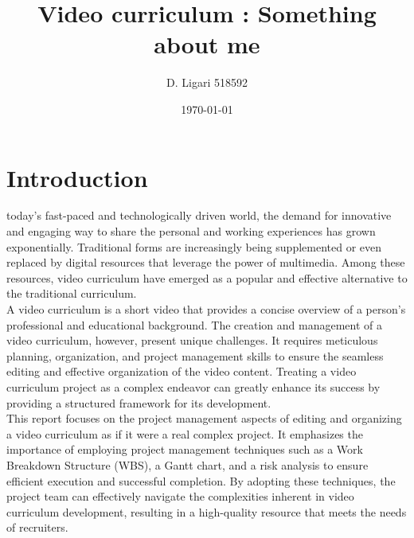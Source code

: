 \documentclass[eng]{class}
\title{Video curriculum : Something about me}
\author{D. Ligari 518592}
\affil{Digital content retrieval, University of Pavia, Department of Computer Engineering (Data Science), Pavia, Italy}
\date{\today}
\begin{document}
\maketitle
\tableofcontents
\thispagestyle{FirstPage}
\section{Introduction}
today's fast-paced and technologically driven world, the demand for innovative and engaging way to share the personal and working experiences has grown exponentially.
Traditional forms are increasingly being supplemented or even replaced by digital resources that leverage the power of multimedia.
Among these resources, video curriculum have emerged as a popular and effective alternative to the traditional curriculum.\\
A video curriculum is a short video that provides a concise overview of a person's professional and educational background.
The creation and management of a video curriculum, however, present unique challenges.
It requires meticulous planning, organization, and project management skills to ensure the seamless editing and effective organization of the video content.
Treating a video curriculum project as a complex endeavor can greatly enhance its success by providing a structured framework for its development.\\
This report focuses on the project management aspects of editing and organizing a video curriculum as if it were a real complex project.
It emphasizes the importance of employing project management techniques such as a Work Breakdown Structure (WBS), a Gantt chart,
and a risk analysis to ensure efficient execution and successful completion. By adopting these techniques,
the project team can effectively navigate the complexities inherent in video curriculum development,
resulting in a high-quality resource that meets the needs of recruiters.
\end{document}
